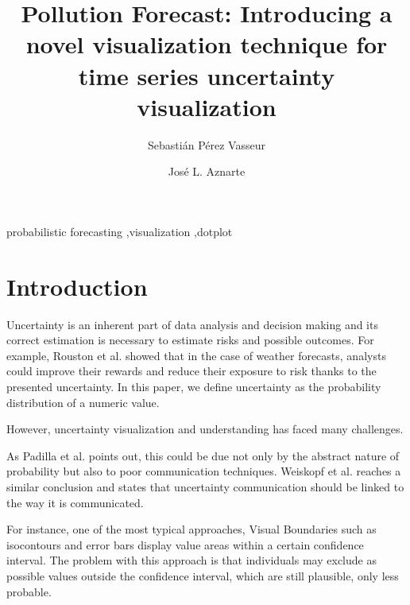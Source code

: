 \documentclass[a4paper,3p,sort&compress]{elsarticle}
\begin{document}
\linenumbers

\newcommand{\no}{NO\textsubscript{2}\xspace}

\begin{frontmatter}

  \title{Pollution Forecast: Introducing a novel visualization technique for time series uncertainty visualization}


  \author{Sebasti\'an P\'erez Vasseur}
  \author{Jos\'e L. Aznarte}
  \address{Artificial Intelligence Department\\Universidad Nacional de
    Educaci\'on a Distancia --- UNED\\c/ Juan del Rosal, 16, Madrid, Spain}
  

\begin{abstract}
  
\end{abstract}

\begin{keyword}
probabilistic forecasting \sep visualization \sep dotplot
\end{keyword}

\end{frontmatter}


\section{Introduction}
\label{sec:intro}

Uncertainty is an inherent part of data analysis and decision making and its correct estimation 
is necessary to estimate risks and possible outcomes. For example, Rouston et al. showed that 
in the case of weather forecasts, analysts could improve their rewards and reduce their exposure 
to risk thanks to the presented uncertainty. In this paper, we define uncertainty as the probability 
distribution of a numeric value.

However, uncertainty visualization and understanding has faced many challenges. 

As Padilla et al. points out, this could be due not only by the abstract nature of probability 
but also to poor communication techniques. Weiskopf et al. reaches a similar conclusion and states 
that uncertainty communication should be linked to the way it is communicated.

For instance, one of the most typical approaches, Visual Boundaries such as isocontours and error 
bars display value areas within a certain  confidence interval. The problem with this approach is 
that individuals may exclude as possible values outside the confidence interval, which are still 
plausible, only less probable. 
\end{document}

